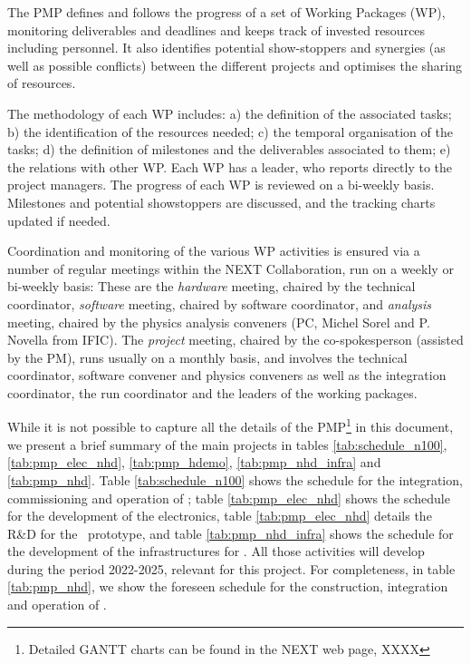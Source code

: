 \indent
 
The PMP defines and follows the progress of a set of Working Packages (WP), monitoring deliverables and deadlines and keeps track of invested resources including personnel. It also identifies potential show-stoppers and synergies (as well as possible conflicts) between the different projects and optimises the sharing of resources. 

\indent

The methodology of each WP includes: a) the definition of the associated tasks; b) the identification of the resources needed; c) the temporal organisation of the tasks; d) the definition of milestones and the deliverables associated to them; e) the relations with other WP. Each WP has a leader, who reports directly to the project managers. The progress of each WP is reviewed on a bi-weekly basis. Milestones and potential showstoppers are discussed, and the tracking charts updated if needed.

Coordination and monitoring of the various WP activities is ensured via a number of regular meetings within the NEXT Collaboration, run on a weekly or bi-weekly basis: These are the  {\em hardware} meeting, chaired by the technical coordinator, {\em software} meeting, chaired by software coordinator, and {\em analysis} meeting, chaired by the physics analysis conveners (PC, Michel Sorel and P. Novella from IFIC). The {\em project} meeting, chaired by the co-spokesperson (assisted by the PM), runs usually on a monthly basis, and involves the technical coordinator, software convener and physics conveners as well as the integration coordinator, the run coordinator and the leaders of the working packages. 

\indent

While it is not possible to capture all the details of the PMP\footnote{Detailed GANTT charts can be found in the NEXT web page, XXXX} in this document, we present a brief summary of the main projects in tables \ref{tab:schedule_n100}, \ref{tab:pmp_elec_nhd}, \ref{tab:pmp_hdemo}, \ref{tab:pmp_nhd_infra} and
\ref{tab:pmp_nhd}. Table  \ref{tab:schedule_n100} shows the schedule for the integration, commissioning and operation of \Next; 
table \ref{tab:pmp_elec_nhd} shows the schedule for the development of the electronics, table  \ref{tab:pmp_elec_nhd} details the R\&D for the \HDEMO\ prototype, and table \ref{tab:pmp_nhd_infra} shows the schedule for the development of the infrastructures for \NHD. All those activities will develop during the period
2022-2025, relevant for this project. For completeness, in table \ref{tab:pmp_nhd}, we show the foreseen schedule for the construction, integration and operation of \NHD.







